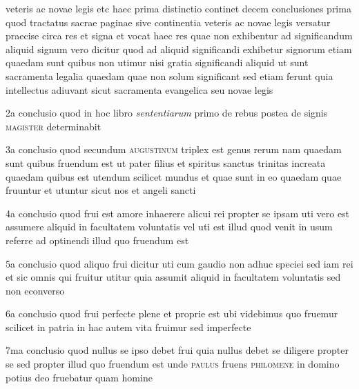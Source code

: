 \documentclass[twoside, openright]{article}
\newcommand{\name}[1]{\textsc{#1}}
\newcommand{\worktitle}[1]{\textit{#1}}
\begin{document}
        \pstart
        veteris ac novae legis etc haec prima distinctio continet decem conclusiones prima quod tractatus sacrae paginae sive continentia veteris ac novae legis versatur praecise circa res et signa et vocat haec res quae non exhibentur ad significandum aliquid  signum vero dicitur quod ad aliquid significandi exhibetur signorum etiam quaedam sunt quibus non utimur nisi gratia significandi aliquid ut sunt sacramenta legalia quaedam quae non solum significant sed etiam ferunt quia intellectus adiuvant sicut sacramenta evangelica seu novae legis
        \pend
     
        \pstart
        2a conclusio quod in hoc libro \worktitle{sententiarum}\index[works]{} primo de rebus postea de signis \name{magister} determinabit
        \pend
     
        \pstart
        3a conclusio quod secundum \name{augustinum} triplex est genus rerum nam quaedam sunt quibus fruendum est ut pater filius et spiritus sanctus trinitas increata  quaedam quibus est utendum scilicet mundus et quae sunt in eo quaedam quae fruuntur et utuntur sicut nos et angeli sancti
        \pend
     
        \pstart
        4a conclusio quod frui est amore inhaerere alicui rei propter se ipsam uti vero est assumere aliquid in facultatem voluntatis  vel uti est illud quod venit in usum referre ad optinendi illud quo fruendum est
        \pend
     
        \pstart
        5a conclusio quod aliquo frui dicitur uti cum gaudio non adhuc speciei sed iam rei et sic omnis qui fruitur utitur quia assumit aliquid in facultatem voluntatis sed non econverso
        \pend
     
        \pstart
        6a conclusio quod frui perfecte plene et proprie est ubi videbimus quo fruemur scilicet in patria in hac autem vita fruimur sed imperfecte
        \pend
     
        \pstart
        7ma conclusio quod nullus se ipso debet frui quia nullus debet se diligere propter se sed propter illud quo fruendum est unde \name{paulus} fruens \name{philomene}\index[persons]{} in domino potius deo fruebatur quam homine
        \pend
     
\end{document}
